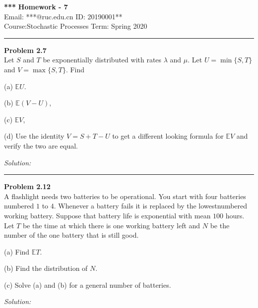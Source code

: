 \documentclass[a4paper, 11pt]{article}
\newenvironment{problem}[2][Problem]
    { \begin{mdframed}[backgroundcolor=gray!20] \textbf{#1 #2} \\}
    {  \end{mdframed}}
\newenvironment{solution}
    {\textit{Solution:}}
    {}
\begin{document}
\noindent
\large\textbf{*** } \hfill \textbf{Homework - 7}   \\
Email: ***@ruc.edu.cn \hfill ID: 20190001** \\
\normalsize Course:Stochastic Processes \hfill Term: Spring 2020\\
\noindent\rule{7in}{2.8pt}
\begin{problem}{2.7}
	Let $S$ and $T$ be exponentially distributed with rates $\lambda$ and $\mu$. Let $U =
	\min\{S, T\}$ and $V = \max\{S, T\}$. Find 
	
	(a) $\mathbb{E}U$. 
	
	(b) $\mathbb{E}(V-U)$, 
	
	(c) $\mathbb{E}V$,
	
	(d) Use the identity $V = S +T -U$ to get a different looking formula for $\mathbb{E}V$ and verify
	the two are equal.
\end{problem}
\begin{solution}


\end{solution} 
\noindent\rule{7in}{2.8pt}


\begin{problem}{2.12}
	A flashlight needs two batteries to be operational. You start with four
	batteries numbered $1$ to $4$. Whenever a battery fails it is replaced by the lowestnumbered working battery. Suppose that battery life is exponential with mean
	$100$ hours. Let $T$ be the time at which there is one working battery left and $N$
	be the number of the one battery that is still good. 
	
	(a) Find $\mathbb{E}T$. 
	
	(b) Find the distribution of $N$. 
	
	(c) Solve (a) and (b) for a general number of batteries.
\end{problem}
\begin{solution}

	
\end{solution} 
\end{document}
